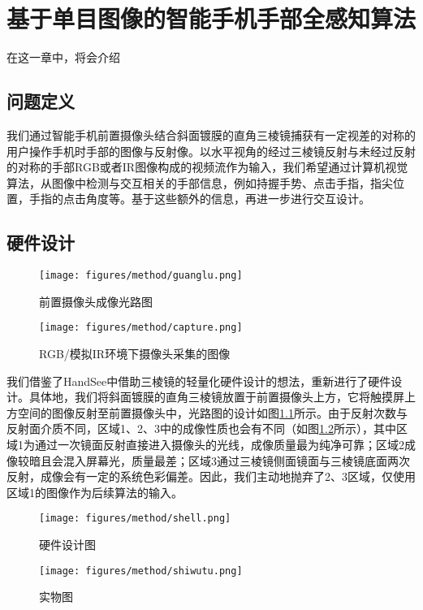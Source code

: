\chapter{基于单目图像的智能手机手部全感知算法}
\label{cha:method}

在这一章中，将会介绍
\section{问题定义}
我们通过智能手机前置摄像头结合斜面镀膜的直角三棱镜捕获有一定视差的对称的用户操作手机时手部的图像与反射像。以水平视角的经过三棱镜反射与未经过反射的对称的手部RGB或者IR图像构成的视频流作为输入，我们希望通过计算机视觉算法，从图像中检测与交互相关的手部信息，例如持握手势、点击手指，指尖位置，手指的点击角度等。基于这些额外的信息，再进一步进行交互设计。

\section{硬件设计}


\begin{figure}
\centering
\texttt{[image: figures/method/guanglu.png]}
\caption{前置摄像头成像光路图}
\label{fig:guanglu}
\end{figure}

\begin{figure}
\centering
\texttt{[image: figures/method/capture.png]}
\caption{RGB/模拟IR环境下摄像头采集的图像}
\label{fig:capture}
\end{figure}

我们借鉴了HandSee\cite{Yu:2019:HEF:3290605.3300935}中借助三棱镜的轻量化硬件设计的想法，重新进行了硬件设计。具体地，我们将斜面镀膜的直角三棱镜放置于前置摄像头上方，它将触摸屏上方空间的图像反射至前置摄像头中，光路图的设计如图\ref{fig:guanglu}所示。由于反射次数与反射面介质不同，区域1、2、3中的成像性质也会有不同（如图\ref{fig:capture}所示），其中区域1为通过一次镜面反射直接进入摄像头的光线，成像质量最为纯净可靠；区域2成像较暗且会混入屏幕光，质量最差；区域3通过三棱镜侧面镜面与三棱镜底面两次反射，成像会有一定的系统色彩偏差。因此，我们主动地抛弃了2、3区域，仅使用区域1的图像作为后续算法的输入。

\begin{figure}
\begin{minipage}[t]{0.5\linewidth}
\centering
\texttt{[image: figures/method/shell.png]}
\caption{硬件设计图}
\label{fig:hardware_design}
\end{minipage}%
\begin{minipage}[t]{0.5\linewidth}
\centering
\texttt{[image: figures/method/shiwutu.png]}
\caption{实物图}
\label{fig:hardware_real}
\end{minipage}
\end{figure}


